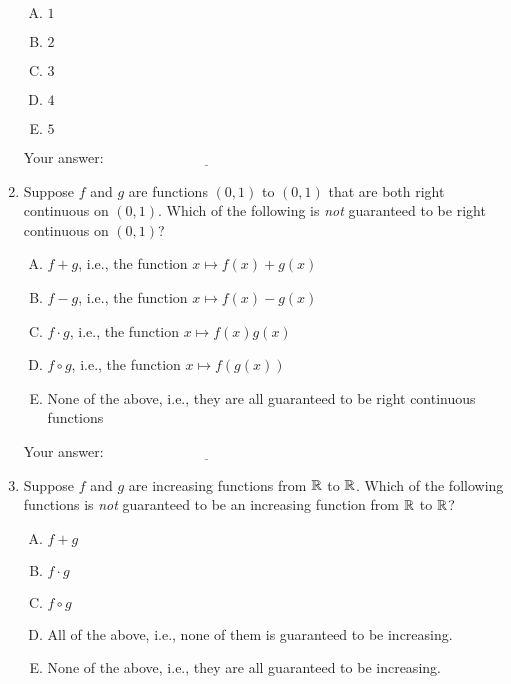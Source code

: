 \documentclass[10pt]{amsart}
\begin{document}
\begin{enumerate}
  \begin{enumerate}[(A)]
  \item $1$
  \item $2$
  \item $3$
  \item $4$
  \item $5$
  \end{enumerate}

  
  \vspace{0.05in}
  Your answer: $\underline{\qquad\qquad\qquad\qquad\qquad\qquad\qquad}$
  \vspace{0.05in}

\item Suppose $f$ and $g$ are functions $(0,1)$ to $(0,1)$ that are
  both right continuous on $(0,1)$. Which of the following is {\em
  not} guaranteed to be right continuous on $(0,1)$? 

  \begin{enumerate}[(A)]
  \item $f + g$, i.e., the function $x \mapsto f(x) + g(x)$
  \item $f - g$, i.e., the function $x \mapsto f(x) - g(x)$
  \item $f \cdot g$, i.e., the function $x \mapsto f(x)g(x)$
  \item $f \circ g$, i.e., the function $x \mapsto f(g(x))$
  \item None of the above, i.e., they are all guaranteed to be right
    continuous functions
  \end{enumerate}

  \vspace{0.05in}
  Your answer: $\underline{\qquad\qquad\qquad\qquad\qquad\qquad\qquad}$
  \vspace{0.05in}

\item Suppose $f$ and $g$ are increasing functions from $\mathbb{R}$ to
  $\mathbb{R}$. Which of the following functions is {\em not} guaranteed to be
  an increasing function from $\mathbb{R}$ to $\mathbb{R}$? 

  \begin{enumerate}[(A)]

  \item $f + g$
  \item $f \cdot g$
  \item $f \circ g$
  \item All of the above, i.e., none of them is guaranteed to be increasing.
  \item None of the above, i.e., they are all guaranteed to be increasing.
  \end{enumerate}


\end{enumerate}
\end{document}
